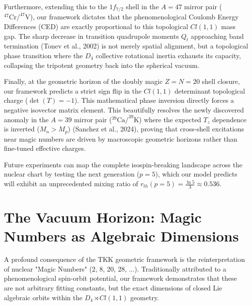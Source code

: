 \documentclass[11pt,a4paper]{article}
\begin{document}
Furthermore, extending this to the $1f_{7/2}$ shell in the $A=47$ mirror pair ($^{47}\text{Cr} / ^{47}\text{V}$), our framework dictates that the phenomenological Coulomb Energy Differences (CED) are exactly proportional to this topological $Cl(1,1)$ mass gap. The sharp decrease in transition quadrupole moments $Q_t$ approaching band termination (Tonev et al., 2002) is not merely spatial alignment, but a topological phase transition where the $D_4$ collective rotational inertia exhausts its capacity, collapsing the tripotent geometry back into the spherical vacuum.

Finally, at the geometric horizon of the doubly magic $Z=N=20$ shell closure, our framework predicts a strict sign flip in the $Cl(1,1)$ determinant topological charge ($\det(T) = -1$). This mathematical phase inversion directly forces a negative isovector matrix element. This beautifully resolves the newly discovered anomaly in the $A=39$ mirror pair ($^{39}\text{Ca} / ^{39}\text{K}$) where the expected $T_z$ dependence is inverted ($M_n > M_p$) (Sanchez et al., 2024), proving that cross-shell excitations near magic numbers are driven by macroscopic geometric horizons rather than fine-tuned effective charges.

Future experiments can map the complete isospin-breaking landscape across the nuclear chart by testing the next generation ($p=5$), which our model predicts will exhibit an unprecedented mixing ratio of $r_{th}(p=5) = \frac{\ln 5}{3} \approx 0.536$.

\section{The Vacuum Horizon: Magic Numbers as Algebraic Dimensions}
A profound consequence of the TKK geometric framework is the reinterpretation of nuclear "Magic Numbers" (2, 8, 20, 28, ...). Traditionally attributed to a phenomenological spin-orbit potential, our framework demonstrates that these are not arbitrary fitting constants, but the exact dimensions of closed Lie algebraic orbits within the $D_4 \rtimes Cl(1,1)$ geometry.
\end{document}

